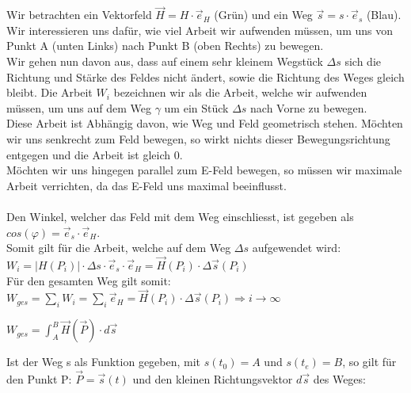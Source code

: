 \iend
{}
\beginip
Wir betrachten ein Vektorfeld $\vec{H} = H \cdot \vec{e}_H$  (Grün) und ein Weg $\vec{s} = s \cdot \vec{e}_s$ (Blau). \\
Wir interessieren uns dafür, wie viel Arbeit wir aufwenden müssen, um uns von Punkt A (unten Links) nach Punkt B (oben Rechts) zu bewegen. \\
Wir gehen nun davon aus, dass auf einem sehr kleinem Wegstück $\Delta s$ sich die Richtung und Stärke des Feldes nicht ändert, sowie die Richtung des Weges gleich bleibt.
Die Arbeit $W_i$ bezeichnen wir als die Arbeit, welche wir aufwenden müssen, um uns auf dem Weg $\gamma$ um ein Stück $\Delta s$ nach Vorne zu bewegen. \\
Diese Arbeit ist Abhängig davon, wie Weg und Feld geometrisch stehen. Möchten wir uns senkrecht zum Feld bewegen, so wirkt nichts dieser Bewegungsrichtung entgegen und die  Arbeit ist gleich 0. \\
Möchten wir uns hingegen parallel zum E-Feld bewegen, so müssen wir maximale Arbeit verrichten, da das E-Feld uns maximal beeinflusst. \\
\\
Den Winkel, welcher das Feld mit dem Weg einschliesst, ist gegeben als $ cos(\varphi) = \vec{e}_s \cdot \vec{e}_H$. \\
Somit gilt für die Arbeit, welche auf dem Weg $\Delta s$ aufgewendet wird: $W_i = |H(P_i)| \cdot \Delta s \cdot  \vec{e}_s \cdot \vec{e}_H = \vec{H}(P_i) \cdot \Delta \vec{s}(P_i)$ \\
Für den gesamten Weg gilt somit:
$\displaystyle W_{ges} = \sum_i W_i = \sum_i \vec{e}_H = \vec{H}(P_i) \cdot \Delta \vec{s}(P_i) \Rightarrow i\rightarrow \infty $

\begin{center}
	$ W_{ges} = \int_A^B \vec{H}(\vec{P})\cdot d\vec{s} $
\end{center}
Ist der Weg s als Funktion gegeben, mit $s(t_0) = A $ und $s(t_e) = B$, so gilt für den Punkt P: $\vec{P} = \vec{s}(t)$ und den kleinen Richtungsvektor $ d\vec{s}$  des Weges: \\



